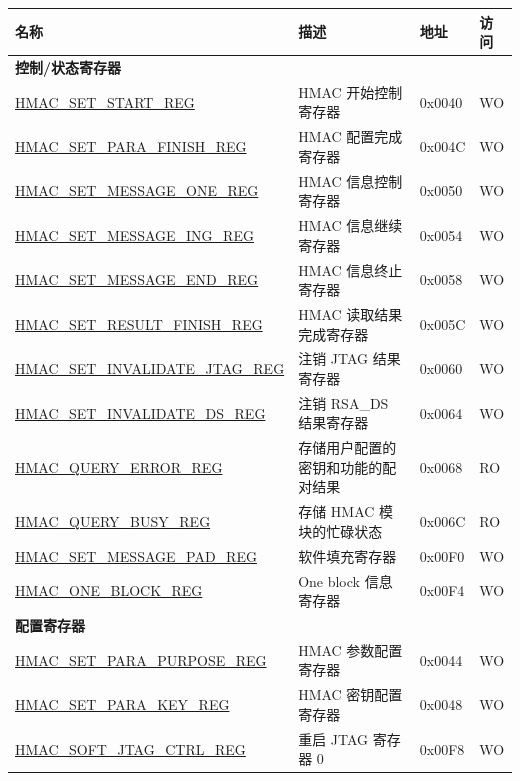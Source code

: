 \begin{longtable}{ | p{6cm} | p{7.2cm} | p{1.3cm} | p{1cm} | }
\hline\rowcolor{lightgray}
名称 & 描述 &  地址 & 访问 \\ \hline
\endhead
\multicolumn{4}{|l|}{\textbf{控制/状态寄存器}} \\ \hline
\hyperref[regdesc:HMACSETSTARTREG]{HMAC\_SET\_START\_REG} & HMAC 开始控制寄存器 & 0x0040 & WO \\ \hline
\hyperref[regdesc:HMACSETPARAFINISHREG]{HMAC\_SET\_PARA\_FINISH\_REG} & HMAC 配置完成寄存器 & 0x004C & WO \\ \hline
\hyperref[regdesc:HMACSETMESSAGEONEREG]{HMAC\_SET\_MESSAGE\_ONE\_REG} & HMAC 信息控制寄存器 & 0x0050 & WO \\ \hline
\hyperref[regdesc:HMACSETMESSAGEINGREG]{HMAC\_SET\_MESSAGE\_ING\_REG} & HMAC 信息继续寄存器 & 0x0054 & WO \\ \hline
\hyperref[regdesc:HMACSETMESSAGEENDREG]{HMAC\_SET\_MESSAGE\_END\_REG} & HMAC 信息终止寄存器 & 0x0058 & WO \\ \hline
\hyperref[regdesc:HMACSETRESULTFINISHREG]{HMAC\_SET\_RESULT\_FINISH\_REG} & HMAC 读取结果完成寄存器 & 0x005C & WO \\ \hline
\hyperref[regdesc:HMACSETINVALIDATEJTAGREG]{HMAC\_SET\_INVALIDATE\_JTAG\_REG} & 注销 JTAG 结果寄存器 & 0x0060 & WO \\ \hline
\hyperref[regdesc:HMACSETINVALIDATEDSREG]{HMAC\_SET\_INVALIDATE\_DS\_REG} & 注销 RSA\_DS 结果寄存器 & 0x0064 & WO \\ \hline
\hyperref[regdesc:HMACQUERYERRORREG]{HMAC\_QUERY\_ERROR\_REG} & 存储用户配置的密钥和功能的配对结果 & 0x0068 & RO \\ \hline
\hyperref[regdesc:HMACQUERYBUSYREG]{HMAC\_QUERY\_BUSY\_REG} & 存储 HMAC 模块的忙碌状态 & 0x006C & RO \\ \hline
\hyperref[regdesc:HMACSETMESSAGEPADREG]{HMAC\_SET\_MESSAGE\_PAD\_REG} & 软件填充寄存器 & 0x00F0 & WO \\ \hline
\hyperref[regdesc:HMACONEBLOCKREG]{HMAC\_ONE\_BLOCK\_REG} & One block 信息寄存器 & 0x00F4 & WO \\ \hline
\multicolumn{4}{|l|}{\textbf{配置寄存器}} \\ \hline
\hyperref[regdesc:HMACSETPARAPURPOSEREG]{HMAC\_SET\_PARA\_PURPOSE\_REG} & HMAC 参数配置寄存器 & 0x0044 & WO \\ \hline
\hyperref[regdesc:HMACSETPARAKEYREG]{HMAC\_SET\_PARA\_KEY\_REG} & HMAC 密钥配置寄存器 & 0x0048 & WO \\ \hline
\hyperref[regdesc:HMACSOFTJTAGCTRLREG]{HMAC\_SOFT\_JTAG\_CTRL\_REG} & 重启 JTAG 寄存器 0 & 0x00F8 & WO \\ \hline

\end{longtable}
